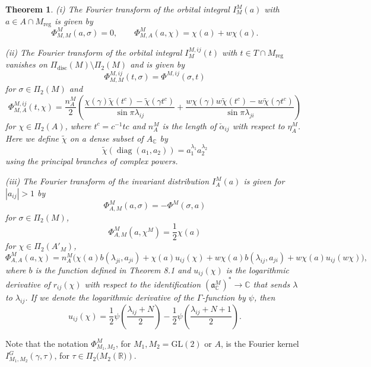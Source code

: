 \documentclass[11pt]{amsart}
\newtheorem {theorem}    {Theorem}[section]
\newcommand{\GGL}{\mathrm{GL}}
\theoremstyle{definition}
\numberwithin{equation}{section}
\begin{document}
	
	\begin{theorem}\cite{Hof08}
		\textit{(i) The Fourier transform of the orbital integral \(I_M^M(a)\) with \(a \in A \cap M_{\text{reg}}\) is given by}
		\[
		\Phi_{M,M}^M(a, \sigma) = 0, \qquad \Phi_{M,A}^M(a, \chi) = \chi(a) + w\chi(a).
		\]
		
		\noindent\textit{(ii) The Fourier transform of the orbital integral \(I_M^{M,ij}(t)\) with \(t \in T \cap M_{\text{reg}}\) vanishes on \(\Pi_{\text{disc}}(M) \setminus \Pi_2(M)\) and is given by}
		\[
		\Phi_{M,M}^{M,ij}(t, \sigma) = \Phi^{M,ij}(\sigma, t)
		\]
		\textit{for \(\sigma \in \Pi_2(M)\) and}
		\[
		\Phi_{M,A}^{M,ij}(t, \chi) = \frac{n_A^M}{2} \left( \frac{\chi(\gamma)\tilde{\chi}(t^c) - \tilde{\chi}(\gamma t^c)}{\sin \pi \lambda_{ij}} + \frac{w\chi(\gamma)w\tilde{\chi}(t^c) - w\tilde{\chi}(\gamma t^c)}{\sin \pi \lambda_{ji}} \right)
		\]
		\textit{for \(\chi \in \Pi_2(A)\), where \(t^c = c^{-1}tc\) and \(n_A^M\) is the length of \(\check{\alpha}_{ij}\) with respect to \(\eta_A^M\). Here we define \(\tilde{\chi}\) on a dense subset of \(A_{\mathbb{C}}\) by}
		\[
		\tilde{\chi}(\operatorname{diag}(a_1, a_2)) = a_1^{\lambda_1} a_2^{\lambda_2}
		\]
		\textit{using the principal branches of complex powers.}
		
		\vspace{1em}
		\noindent\textit{(iii) The Fourier transform of the invariant distribution \(I_A^M(a)\) is given for \(|a_{ij}| > 1\) by}
		\[
		\Phi_{A,M}^M(a, \sigma) = -\Phi^M(\sigma, a)
		\]
		\textit{for \(\sigma \in \Pi_2(M)\),}
		\[
		\Phi_{A,M}^M(a, \chi^M) = \frac{1}{2}\chi(a)
		\]
		\textit{for \(\chi \in \Pi_2(A'_M)\),}
		\[
		\Phi_{A,A}^M(a, \chi) = n_A^M \Big( \chi(a)b(\lambda_{ji}, a_{ji}) + \chi(a)u_{ij}(\chi) + w\chi(a)b(\lambda_{ij}, a_{ji}) + w\chi(a)u_{ij}(w\chi) \Big),
		\]
		\textit{where \(b\) is the function defined in Theorem 8.1 and \(u_{ij}(\chi)\) is the logarithmic derivative of \(r_{ij}(\chi)\) with respect to the identification \((\mathfrak{a}_{\mathbb{C}}^M)^* \to \mathbb{C}\) that sends \(\lambda\) to \(\lambda_{ij}\). If we denote the logarithmic derivative of the \(\Gamma\)-function by \(\psi\), then}
		\[
		u_{ij}(\chi) = \frac{1}{2}\psi\left(\frac{\lambda_{ij} + N}{2}\right) - \frac{1}{2}\psi\left(\frac{\lambda_{ij} + N + 1}{2}\right).
		\]
	\end{theorem}
	Note that the notation \(\Phi^M_{M_1,M_2}\), for \(M_1,M_2=\GGL(2)\) or \(A\), is the Fourier kernel \(I^G_{M_1,M_2}(\gamma,\tau)\), for \(\tau\in \Pi_2(M_2(\mathbb{R)})\).
	
\end{document}
